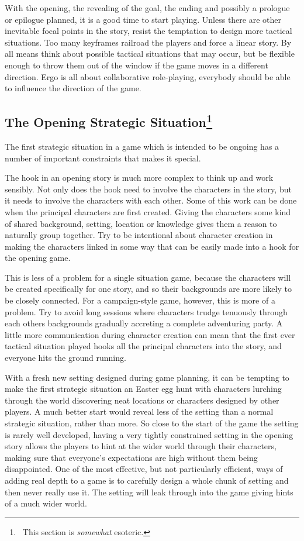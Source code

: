 \documentclass[twoside]{book}
\begin{document}
With the opening, the revealing of the goal, the ending and possibly a
prologue or epilogue planned, it is a good time to start
playing. Unless there are other inevitable focal points in the story,
resist the temptation to design more tactical situations. Too many
keyframes railroad the players and force a linear story. By all means
think about possible tactical situations that may occur, but be
flexible enough to throw them out of the window if the game moves in a
different direction. Ergo is all about collaborative role-playing,
everybody should be able to influence the direction of the game.

\subsection{The Opening Strategic Situation\protect\footnote{~This section is {\it somewhat} esoteric.}}

The first strategic situation in a game which is intended to be
ongoing has a number of important constraints that makes it special.

The hook in an opening story is much more complex to think up and work
sensibly. Not only does the hook need to involve the characters in the
story, but it needs to involve the characters with each other. Some of
this work can be done when the principal characters are first
created. Giving the characters some kind of shared background,
setting, location or knowledge gives them a reason to naturally group
together. Try to be intentional about character creation in making the
characters linked in some way that can be easily made into a hook for
the opening game.

This is less of a problem for a single situation game, because the
characters will be created specifically for one story, and so their
backgrounds are more likely to be closely connected. For a
campaign-style game, however, this is more of a problem. Try to avoid
long sessions where characters trudge tenuously through each others
backgrounds gradually accreting a complete adventuring party. A little
more communication during character creation can mean that the first
ever tactical situation played hooks all the principal characters into
the story, and everyone hits the ground running.

With a fresh new setting designed during game planning, it can be
tempting to make the first strategic situation an Easter egg hunt with
characters lurching through the world discovering neat locations or
characters designed by other players. A much better start would reveal
less of the setting than a normal strategic situation, rather than
more. So close to the start of the game the setting is rarely well
developed, having a very tightly constrained setting in the opening
story allows the players to hint at the wider world through their
characters, making sure that everyone's expectations are high without
them being disappointed. One of the most effective, but not
particularly efficient, ways of adding real depth to a game is to
carefully design a whole chunk of setting and then never really use
it. The setting will leak through into the game giving hints of a much
wider world.
\end{document}
